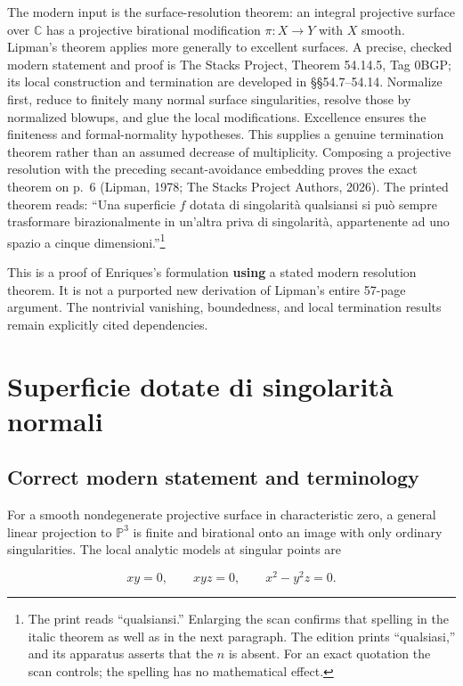 The modern input is the surface-resolution theorem: an integral projective surface over \(\mathbb C\) has a projective birational modification \(\pi:X\to Y\) with \(X\) smooth. Lipman's theorem applies more generally to excellent surfaces. A precise, checked modern statement and proof is The Stacks Project, Theorem 54.14.5, Tag 0BGP; its local construction and termination are developed in §§54.7--54.14. Normalize first, reduce to finitely many normal surface singularities, resolve those by normalized blowups, and glue the local modifications. Excellence ensures the finiteness and formal-normality hypotheses. This supplies a genuine termination theorem rather than an assumed decrease of multiplicity. Composing a projective resolution with the preceding secant-avoidance embedding proves the exact theorem on p.~6 (Lipman, 1978; The Stacks Project Authors, 2026). The printed theorem reads: ``Una superficie \(f\) dotata di singolarità qualsiansi si può sempre trasformare birazionalmente in un'altra priva di singolarità, appartenente ad uno spazio a cinque dimensioni.''\footnote{The print reads ``qualsiansi.'' Enlarging the scan confirms that spelling in the italic theorem as well as in the next paragraph. The edition prints ``qualsiasi,'' and its apparatus asserts that the \(n\) is absent. For an exact quotation the scan controls; the spelling has no mathematical effect.}

This is a proof of Enriques's formulation \textbf{using} a stated modern resolution theorem. It is not a purported new derivation of Lipman's entire 57-page argument. The nontrivial vanishing, boundedness, and local termination results remain explicitly cited dependencies.

\section{Superficie dotate di singolarità normali}
\label{enriques-intro-4}

\subsection{Correct modern statement and terminology}

For a smooth nondegenerate projective surface in characteristic zero, a general linear projection to \(\mathbb P^3\) is finite and birational onto an image with only ordinary singularities. The local analytic models at singular points are

\[
xy=0,\qquad xyz=0,\qquad x^2-y^2z=0.
\]

